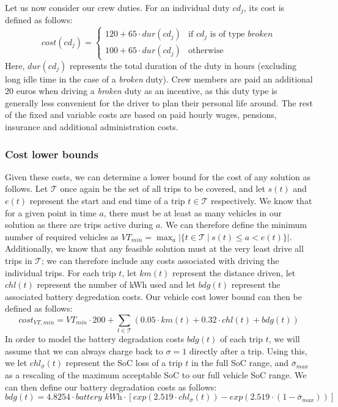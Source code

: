 \documentclass[]{article}
\begin{document}
\noindent Let us now consider our crew duties. For an individual duty $cd_j$, its cost is defined as follows:
\begin{equation}
  cost(cd_j) =
  \begin{cases}
    120 + 65 \cdot dur(cd_j) & \text{if } cd_j \text{ is of type }\textit{broken} \\ 
    100 + 65 \cdot dur(cd_j) & \text{otherwise}
  \end{cases} \nonumber
\end{equation}
Here, $dur(cd_j)$ represents the total duration of the duty in hours (excluding long idle time in the case of a \textit{broken} duty). Crew members are paid an additional 20 euros when driving a \textit{broken} duty as an incentive, as this duty type is generally less convenient for the driver to plan their personal life around. The rest of the fixed and variable costs are based on paid hourly wages, pensions, insurance and additional administration costs.

\subsubsection{Cost lower bounds}
Given these costs, we can determine a lower bound for the cost of any solution as follows. Let $\mathcal{T}$ once again be the set of all trips to be covered, and let $s(t)$ and $e(t)$ represent the start and end time of a trip $t \in \mathcal{T}$ respectively. We know that for a given point in time $a$, there must be at least as many vehicles in our solution as there are trips active during $a$. We can therefore define the minimum number of required vehicles as $VT_{min} = \max_{a} |\{ t \in \mathcal{T} \:|\: s(t) \leq a < e(t) \}|$. Additionally, we know that any feasible solution must at the very least drive all trips in $\mathcal{T}$; we can therefore include any costs associated with driving the individual trips. For each trip $t$, let $km(t)$ represent the distance driven, let $chl(t)$ represent the number of kWh used and let $bdg(t)$ represent the associated battery degredation costs. Our vehicle cost lower bound can then be defined as follows:
\begin{equation}
  cost_{VT,min} = VT_{min} \cdot 200 + \sum_{t \in \mathcal{T}} (0.05 \cdot km(t) + 0.32 \cdot chl(t) + bdg(t)) \nonumber 
\end{equation}
In order to model the battery degradation costs $bdg(t)$ of each trip $t$, we will assume that we can always charge back to $\sigma=1$ directly after a trip. Using this, we let $chl_{\bar{\sigma}}(t)$ represent the SoC loss of a trip $t$ in the full SoC range, and $\bar{\sigma}_{max}$ as a rescaling of the maximum acceptable SoC to our full vehicle SoC range. We can then define our battery degradation costs as follows: 
\begin{equation}
  bdg(t) = 4.8254 \cdot \textit{battery kWh} \cdot [exp(2.519 \cdot chl_{\bar{\sigma}}(t)) - exp(2.519 \cdot (1 - \bar{\sigma}_{max}))] \nonumber
\end{equation}
\end{document}
